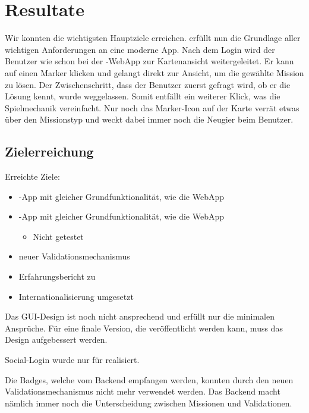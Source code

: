 \chapter{Resultate}
\label{tb-resultate}

Wir konnten die wichtigsten Hauptziele erreichen.
\kort{} erfüllt nun die Grundlage aller wichtigen Anforderungen an eine moderne App.
Nach dem Login wird der Benutzer wie schon bei der \kort{}-\gls{WebApp} zur Kartenansicht weitergeleitet.
Er kann auf einen Marker klicken und gelangt direkt zur Ansicht, um die gewählte Mission zu lösen.
Der Zwischenschritt, dass der Benutzer zuerst gefragt wird, ob er die Lösung kennt, wurde weggelassen.
Somit entfällt ein weiterer Klick, was die Spielmechanik vereinfacht.
Nur noch das Marker-Icon auf der Karte verrät etwas über den Missionstyp und weckt dabei immer noch die Neugier beim Benutzer.


\section{Zielerreichung}

Erreichte Ziele:
\begin{itemize}
	\item {}-App mit gleicher Grundfunktionalität, wie die \gls{WebApp}
	\item {}-App mit gleicher Grundfunktionalität, wie die \gls{WebApp}
	\begin{itemize}
		\item Nicht getestet
	\end{itemize}
	\item neuer Validationsmechanismus
	\item Erfahrungsbericht zu 
	\item Internationalisierung umgesetzt
\end{itemize}

Das GUI-Design ist noch nicht ansprechend und erfüllt nur die minimalen Ansprüche.
Für eine finale Version, die veröffentlicht werden kann, muss das Design aufgebessert werden. 

Social-Login wurde nur für  realisiert.

Die Badges, welche vom Backend empfangen werden, konnten durch den neuen Validationsmechanismus nicht mehr verwendet werden.
Das Backend macht nämlich immer noch die Unterscheidung zwischen Missionen und Validationen.

